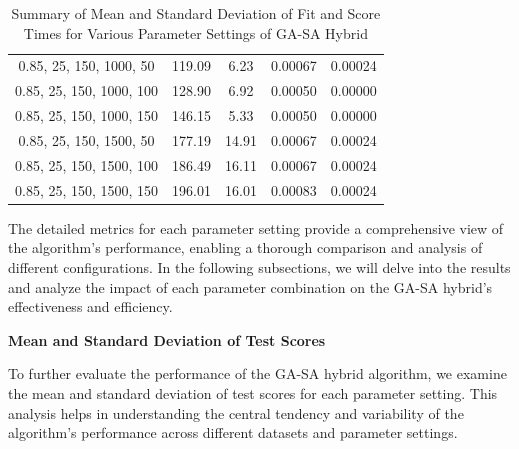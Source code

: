 \documentclass{article}
\begin{document}
\begin{table}[H]
{\begin{tabular}{|c|c|c|c|c|}
                0.85, 25, 150, 1000, 50    & 119.09                 & 6.23                  & 0.00067                  & 0.00024                 \\
                0.85, 25, 150, 1000, 100   & 128.90                 & 6.92                  & 0.00050                  & 0.00000                 \\
                0.85, 25, 150, 1000, 150   & 146.15                 & 5.33                  & 0.00050                  & 0.00000                 \\
                0.85, 25, 150, 1500, 50    & 177.19                 & 14.91                 & 0.00067                  & 0.00024                 \\
                0.85, 25, 150, 1500, 100   & 186.49                 & 16.11                 & 0.00067                  & 0.00024                 \\
                0.85, 25, 150, 1500, 150   & 196.01                 & 16.01                 & 0.00083                  & 0.00024                 \\
                \hline
            \end{tabular}
        }
        \caption{Summary of Mean and Standard Deviation of Fit and Score Times for Various Parameter Settings of GA-SA Hybrid}
        \label{tab:gasa_summary_fit_score_times}
    \end{table}

    The detailed metrics for each parameter setting provide a comprehensive view of the algorithm's performance, enabling a thorough comparison and analysis of different configurations. In the following subsections, we will delve into the results and analyze the impact of each parameter combination on the GA-SA hybrid's effectiveness and efficiency.

    \textbf{Mean and Standard Deviation of Test Scores}

    To further evaluate the performance of the GA-SA hybrid algorithm, we examine the mean and standard deviation of test scores for each parameter setting. This analysis helps in understanding the central tendency and variability of the algorithm's performance across different datasets and parameter settings.
\end{document}
